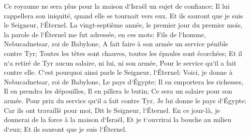 \verse Ce royaume ne sera plus pour la maison d`Israël un sujet de confiance; Il lui rappellera son iniquité, quand elle se tournait vers eux. Et ils sauront que je suis le Seigneur, l`Éternel. 
\verse La vingt-septième année, le premier jour du premier mois, la parole de l`Éternel me fut adressée, en ces mots: 
\verse Fils de l`homme, Nebucadnetsar, roi de Babylone, A fait faire à son armée un service pénible contre Tyr; Toutes les têtes sont chauves, toutes les épaules sont écorchées; Et il n`a retiré de Tyr aucun salaire, ni lui, ni son armée, Pour le service qu`il a fait contre elle. 
\verse C`est pourquoi ainsi parle le Seigneur, l`Éternel: Voici, je donne à Nebucadnetsar, roi de Babylone, Le pays d`Égypte; Il en emportera les richesses, Il en prendra les dépouilles, Il en pillera le butin; Ce sera un salaire pour son armée. 
\verse Pour prix du service qu`il a fait contre Tyr, Je lui donne le pays d`Égypte; Car ils ont travaillé pour moi, Dit le Seigneur, l`Éternel. 
\verse En ce jour-là, je donnerai de la force à la maison d`Israël, Et je t`ouvrirai la bouche au milieu d`eux; Et ils sauront que je suis l`Éternel. 

